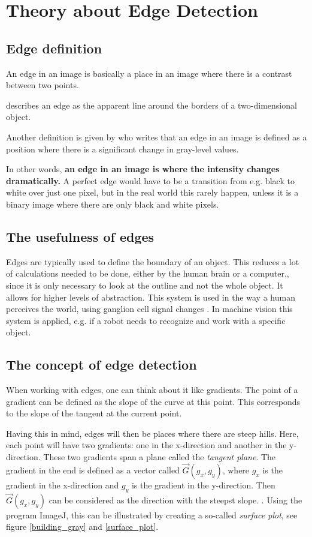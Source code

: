\chapter{Theory about Edge Detection}
\section{Edge definition}
An edge in an image is basically a place in an image where there is a contrast between two points.

\citet{visual_story} describes an edge as the apparent line around the borders of a two-dimensional object.

Another definition is given by \citep{ip_book} who writes that an edge in an image is defined as a position where there is a significant change in gray-level values.

In other words, \textbf{an edge in an image is where the intensity changes dramatically.} A perfect edge would have to be a transition from e.g. black to white over just one pixel, but in the real world this rarely happen, unless it is a binary image where there are only black and white pixels.

\section{The usefulness of edges}
Edges are typically used to define the boundary of an object. This reduces a lot of calculations needed to be done, either by the human brain or a computer,, since it is only necessary to look at the outline and not the whole object. It allows for higher levels of abstraction. This system is used in the way a human perceives the world, using ganglion cell signal changes \citep{perception} . In machine vision this system is applied, e.g. if a robot needs to recognize and work with a specific object.

\section{The concept of edge detection}
When working with edges, one can think about it like gradients. The point of a gradient can be defined as the slope of the curve at this point. This corresponds to the slope of the tangent at the current point. \citep{ip_book} 

Having this in mind, edges will then be places where there are steep hills. Here, each point will have two gradients: one in the x-direction and another in the y-direction. These two gradients span a plane called the \textit{tangent plane}. The gradient in the end is defined as a vector called $\vec{G}(g_x,g_y)$, where $g_x$ is the gradient in the x-direction and $g_y$ is the gradient in the y-direction. Then $\vec{G}(g_x,g_y)$ can be considered as the direction with the steepst slope. \citep{ip_book}. Using the program ImageJ, this can be illustrated by creating a so-called \textit{surface plot}, see figure \ref{building_gray} and \ref{surface_plot}.

